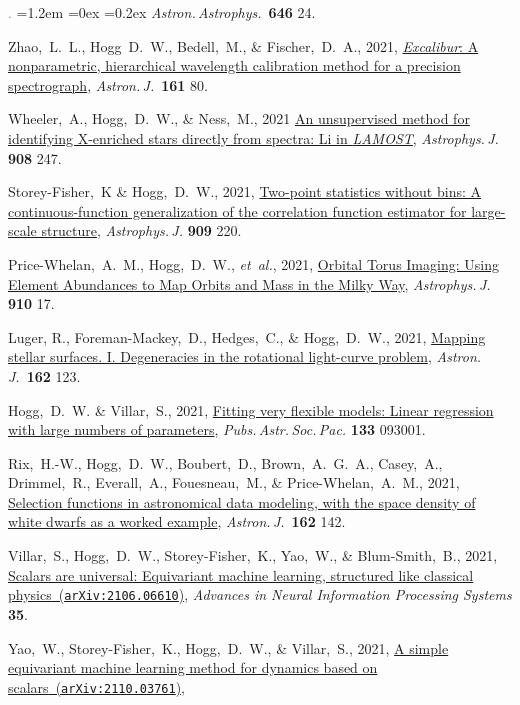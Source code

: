 \documentclass[10pt,letterpaper]{article}
\newcommand{\acronym}[1]{{\small{#1}}}
\newcommand{\foreign}[1]{\textsl{#1}}
\newcommand{\etal}{\foreign{et~al.}}
\newcommand{\project}[1]{\textsl{#1}}
\newcommand{\doi}[2]{\href{http://dx.doi.org/#1}{{#2}}}
\newcommand{\arxiv}[2]{\href{http://arxiv.org/abs/#1}{{#2}\ (\texttt{arXiv:#1})}}
\newcommand{\deemph}[1]{\textcolor{grey}{\footnotesize{#1}}}
\newcommand{\pubnumber}[1]{\deemph{{#1}.}}
\newcounter{refpubnum}
\newcommand{\hogglist}{%
    \rightmargin=0in
    \leftmargin=1.2em
    \topsep=0ex
    \partopsep=0pt
    \itemsep=0.2ex
    \parsep=0pt
    \itemindent=-1.0\leftmargin
    \listparindent=0.0\leftmargin
    \settowidth{\labelsep}{~}
    \usecounter{refpubnum}
  }
\begin{document}
\begin{list}{\pubnumber{\therefpubnum}}{\hogglist}
  \textit{Astron.\,Astrophys.}\ \textbf{646} 24.
\item
  Zhao,~L.~L., Hogg~D.~W., Bedell,~M., \& Fischer,~D.~A., 2021,
  \doi{10.3847/1538-3881/abd105}{\project{Excalibur}: A nonparametric, hierarchical wavelength calibration method for a precision spectrograph},
  \textit{Astron.\,J.}\ \textbf{161} 80.
\item
  Wheeler,~A., Hogg,~D.~W., \& Ness,~M., 2021
  \doi{10.3847/1538-4357/abd544}{An unsupervised method for identifying X-enriched stars directly from spectra: Li in \project{\acronym{LAMOST}}},
  \textit{Astrophys.\,J.} \textbf{908} 247.
\item
  Storey-Fisher,~K \& Hogg,~D.~W., 2021,
  \doi{10.3847/1538-4357/abdc21}{Two-point statistics without bins: A continuous-function generalization of the correlation function estimator for large-scale structure},
  \textit{Astrophys.\,J.} \textbf{909} 220.
\item
  Price-Whelan,~A.~M., Hogg,~D.~W., \etal, 2021,
  \doi{10.3847/1538-4357/abe1b7}{Orbital Torus Imaging: Using Element Abundances to Map Orbits and Mass in the Milky Way},
  \textit{Astrophys.\,J.} \textbf{910} 17.
\item
  Luger, R., Foreman-Mackey,~D., Hedges,~C., \& Hogg,~D.~W., 2021,
  \doi{10.3847/1538-3881/abfdb8}{Mapping stellar surfaces. I. Degeneracies in the rotational light-curve problem},
  \textit{Astron.\,J.}\ \textbf{162} 123.
\item
  Hogg,~D.~W. \& Villar,~S., 2021,
  \doi{10.1088/1538-3873/ac20ac}{Fitting very flexible models: Linear regression with large numbers of parameters},
  \textit{Pubs.\,Astr.\,Soc.\,Pac.} \textbf{133} 093001.
\item
  Rix,~H.-W., Hogg,~D.~W., Boubert,~D., Brown,~A.~G.~A., Casey,~A.,
  Drimmel,~R., Everall,~A., Fouesneau,~M., \& Price-Whelan,~A.~M., 2021,
  \doi{10.3847/1538-3881/ac0c13}{Selection functions in astronomical data modeling, with the space density of white dwarfs as a worked example},
  \textit{Astron.\,J.}\ \textbf{162} 142.
\item
  Villar,~S., Hogg,~D.~W., Storey-Fisher,~K., Yao,~W., \& Blum-Smith,~B., 2021,
  \arxiv{2106.06610}{Scalars are universal: Equivariant machine learning, structured like classical physics},
  \textit{Advances in Neural Information Processing Systems} \textbf{35}.
\item
  Yao,~W., Storey-Fisher,~K., Hogg,~D.~W., \& Villar,~S., 2021,
  \arxiv{2110.03761}{A simple equivariant machine learning method for dynamics based on scalars},

\end{list}
\end{document}

